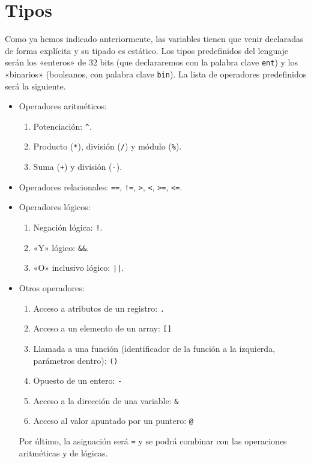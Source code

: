 \section*{Tipos}
Como ya hemos indicado anteriormente, las variables tienen que venir declaradas
de forma explícita y su tipado es estático. Los tipos predefinidos del lenguaje
serán los «enteros» de $32$ bits (que declararemos con la palabra clave
\lstinline{ent}) y los «binarios» (booleanos, con palabra clave
\lstinline{bin}). La lista de operadores predefinidos será la siguiente.
\begin{itemize}
\item Operadores aritméticos:
    \begin{enumerate}
        \item Potenciación: \lstinline{^}.
        \item Producto (\lstinline{*}), división (\lstinline{/}) y módulo (\lstinline{%}).
        \item Suma (\lstinline{+}) y división (\lstinline{-}).
    \end{enumerate}
\item Operadores relacionales: \lstinline{==}, \lstinline{!=}, \lstinline{>}, \lstinline{<},
    \lstinline{>=}, \lstinline{<=}.

\item Operadores lógicos:
\begin{enumerate}
    \item Negación lógica: \lstinline{!}.
    \item «Y» lógico: \lstinline{&&}.
    \item «O» inclusivo lógico: \lstinline{||}.
\end{enumerate}

\item Otros operadores:
\begin{enumerate}
    \item Acceso a atributos de un registro: \lstinline{.}
    \item Acceso a un elemento de un array: \lstinline{[]}
    \item Llamada a una función (identificador de la función a la izquierda,
        parámetros dentro): \lstinline{()}
    \item Opuesto de un entero: \lstinline{-}
    \item Acceso a la dirección de una variable: \lstinline{&}
    \item Acceso al valor apuntado por un puntero: \lstinline{@}
\end{enumerate}
Por último, la asignación será \lstinline{=} y se podrá combinar con las
operaciones aritméticas y de lógicas.
\end{itemize}
